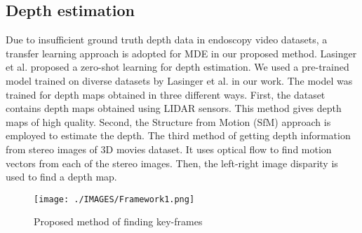 \documentclass[journal]{IEEEtran}
\begin{document}
\subsection{Depth estimation}
Due to insufficient ground truth depth data in endoscopy video datasets, a transfer learning approach is adopted for MDE in our proposed method. Lasinger et al. \cite{lasinger2019towards} proposed a zero-shot learning for depth estimation. 
We used a pre-trained model trained on diverse datasets by Lasinger et al. \cite{lasinger2019towards} in our work. The model was trained for depth maps obtained in three different ways. First, the dataset contains depth maps obtained using LIDAR sensors. This method gives depth maps of high quality. Second, the Structure from Motion (SfM) approach is employed to estimate the depth. The third method of getting depth information from stereo images of 3D movies dataset. It uses optical flow to find motion vectors from each of the stereo images. Then, the left-right image disparity is used to find a depth map. 

%

\begin{figure}
\centering     %
\texttt{[image: ./IMAGES/Framework1.png]}
\caption{Proposed method of finding key-frames}
\label{process}
\end{figure}
\end{document}
